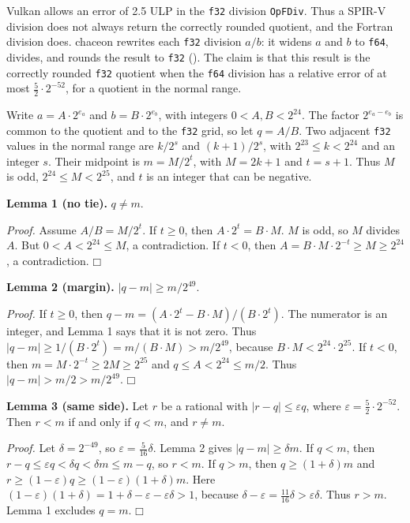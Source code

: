 \documentclass[10pt,a4paper,]{article}
\begin{document}
Vulkan allows an error of 2.5 ULP in the \texttt{f32} division
\texttt{OpFDiv}. Thus a SPIR-V division does not always return the
correctly rounded quotient, and the Fortran division does. chaceon
rewrites each \texttt{f32} division \(a/b\): it widens \(a\) and \(b\)
to \texttt{f64}, divides, and rounds the result to \texttt{f32}
(). The claim is that this
result is the correctly rounded \texttt{f32} quotient when the
\texttt{f64} division has a relative error of at most
\(\tfrac{5}{2}\cdot 2^{-52}\), for a quotient in the normal range.

Write \(a = A\cdot 2^{e_a}\) and \(b = B\cdot 2^{e_b}\), with integers
\(0 < A, B < 2^{24}\). The factor \(2^{e_a-e_b}\) is common to the
quotient and to the \texttt{f32} grid, so let \(q = A/B\). Two adjacent
\texttt{f32} values in the normal range are \(k/2^{s}\) and
\((k+1)/2^{s}\), with \(2^{23} \le k < 2^{24}\) and an integer \(s\).
Their midpoint is \(m = M/2^{t}\), with \(M = 2k+1\) and \(t = s+1\).
Thus \(M\) is odd, \(2^{24} \le M < 2^{25}\), and \(t\) is an integer
that can be negative.

\textbf{Lemma 1 (no tie).} \(q \ne m\).

\emph{Proof.} Assume \(A/B = M/2^{t}\). If \(t \ge 0\), then
\(A\cdot 2^{t} = B\cdot M\). \(M\) is odd, so \(M\) divides \(A\). But
\(0 < A < 2^{24} \le M\), a contradiction. If \(t < 0\), then
\(A = B\cdot M\cdot 2^{-t} \ge M \ge 2^{24}\), a contradiction.
\(\mdlgwhtsquare\)

\textbf{Lemma 2 (margin).} \(|q - m| \ge m/2^{49}\).

\emph{Proof.} If \(t \ge 0\), then
\(q - m = (A\cdot 2^{t} - B\cdot M)/(B\cdot 2^{t})\). The numerator is
an integer, and Lemma 1 says that it is not zero. Thus
\(|q - m| \ge 1/(B\cdot 2^{t}) = m/(B\cdot M) > m/2^{49}\), because
\(B\cdot M < 2^{24}\cdot 2^{25}\). If \(t < 0\), then
\(m = M\cdot 2^{-t} \ge 2M \ge 2^{25}\) and
\(q \le A < 2^{24} \le m/2\). Thus \(|q - m| > m/2 > m/2^{49}\).
\(\mdlgwhtsquare\)

\textbf{Lemma 3 (same side).} Let \(r\) be a rational with
\(|r - q| \le \varepsilon q\), where
\(\varepsilon = \tfrac{5}{2}\cdot 2^{-52}\). Then \(r < m\) if and only
if \(q < m\), and \(r \ne m\).

\emph{Proof.} Let \(\delta = 2^{-49}\), so
\(\varepsilon = \tfrac{5}{16}\delta\). Lemma 2 gives
\(|q - m| \ge \delta m\). If \(q < m\), then
\(r - q \le \varepsilon q < \delta q < \delta m \le m - q\), so
\(r < m\). If \(q > m\), then \(q \ge (1+\delta)m\) and
\(r \ge (1-\varepsilon)q \ge
(1-\varepsilon)(1+\delta)m\). Here
\((1-\varepsilon)(1+\delta) = 1 + \delta - \varepsilon -
\varepsilon\delta > 1\), because
\(\delta - \varepsilon = \tfrac{11}{16}\delta > \varepsilon\delta\).
Thus \(r > m\). Lemma 1 excludes \(q = m\). \(\mdlgwhtsquare\)
\end{document}
